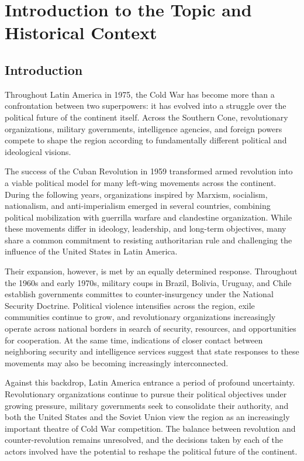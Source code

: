 \section{Introduction to the Topic and Historical Context}

\subsection{Introduction}

Throughout Latin America in 1975, the Cold War has become more than a confrontation between two superpowers: it has evolved into a struggle over the political future of the continent itself. Across the Southern Cone, revolutionary organizations, military governments, intelligence agencies, and foreign powers compete to shape the region according to fundamentally different political and ideological visions.

The success of the Cuban Revolution in 1959 transformed armed revolution into a viable political model for many left-wing movements across the continent. During the following years, organizations inspired by Marxism, socialism, nationalism, and anti-imperialism emerged in several countries, combining political mobilization with guerrilla warfare and clandestine organization. While these movements differ in ideology, leadership, and long-term objectives, many share a common commitment to resisting authoritarian rule and challenging the influence of the United States in Latin America.

Their expansion, however, is met by an equally determined response. Throughout the 1960s and early 1970s, military coups in Brazil, Bolivia, Uruguay, and Chile establish governments committes to counter-insurgency under the National Security Doctrine. Political violence intensifies across the region, exile communities continue to grow, and revolutionary organizations increasingly operate across national borders in search of security, resources, and opportunities for cooperation. At the same time, indications of closer contact between neighboring security and intelligence services suggest that state responses to these movements may also be becoming increasingly interconnected.

Against this backdrop, Latin America entrance a period of profound uncertainty. Revolutionary organizations continue to pursue their political objectives under growing pressure, military governments seek to consolidate their authority, and both the United States and the Soviet Union view the region as an increasingly important theatre of Cold War competition. The balance between revolution and counter-revolution remains unresolved, and the decisions taken by each of the actors involved have the potential to reshape the political future of the continent.

